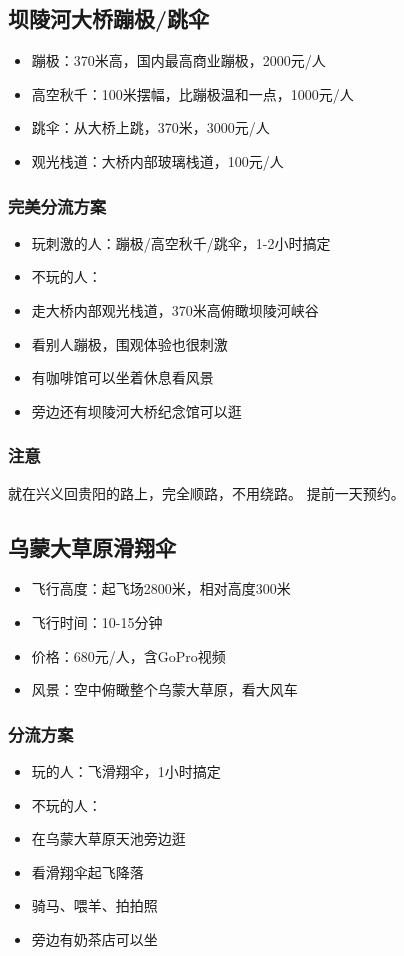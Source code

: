 \documentclass[12pt,a4paper,UTF8]{ctexart}
\begin{document}
\subsection{坝陵河大桥蹦极/跳伞}
\begin{itemize}
\item 蹦极：370米高，国内最高商业蹦极，2000元/人
\item 高空秋千：100米摆幅，比蹦极温和一点，1000元/人
\item 跳伞：从大桥上跳，370米，3000元/人
\item 观光栈道：大桥内部玻璃栈道，100元/人
\end{itemize}

\subsubsection{完美分流方案}
\begin{itemize}
\item 玩刺激的人：蹦极/高空秋千/跳伞，1-2小时搞定
\item 不玩的人：
\item 走大桥内部观光栈道，370米高俯瞰坝陵河峡谷
\item 看别人蹦极，围观体验也很刺激
\item 有咖啡馆可以坐着休息看风景
\item 旁边还有坝陵河大桥纪念馆可以逛
\end{itemize}

\subsubsection{注意}
就在兴义回贵阳的路上，完全顺路，不用绕路。
提前一天预约。

\subsection{乌蒙大草原滑翔伞}
\begin{itemize}
\item 飞行高度：起飞场2800米，相对高度300米
\item 飞行时间：10-15分钟
\item 价格：680元/人，含GoPro视频
\item 风景：空中俯瞰整个乌蒙大草原，看大风车
\end{itemize}

\subsubsection{分流方案}
\begin{itemize}
\item 玩的人：飞滑翔伞，1小时搞定
\item 不玩的人：
\item 在乌蒙大草原天池旁边逛
\item 看滑翔伞起飞降落
\item 骑马、喂羊、拍拍照
\item 旁边有奶茶店可以坐
\end{itemize}
\end{document}

